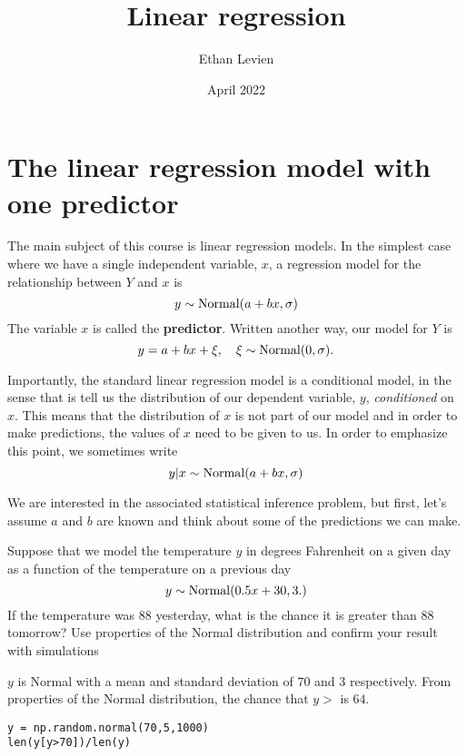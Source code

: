 

\title{\Huge \color{C1}  Linear regression}
\author{Ethan Levien}
\date{April 2022}



\maketitle

\tableofcontents




\section{The linear regression model with one predictor}
The main subject of this course is linear regression models. In the simplest case where we have a single independent variable, $x$, a regression model for the relationship between $Y$ and  $x$ is 
\begin{equation}\label{eq:reg}
y \sim {\rm Normal}(a+ b x,\sigma)
\end{equation}
The variable $x$ is called the {\bf predictor}.  Written another way, our model for $Y$ is 
\begin{equation}
y =a+ bx + \xi,\quad \xi \sim {\rm Normal}(0,\sigma).
\end{equation}


Importantly, the standard linear regression model is a conditional model, in the sense that is tell us the distribution of our dependent variable, $y$, \emph{conditioned} on $x$. This means that the distribution of $x$ is not part of our model and in order to make predictions, the values of $x$ need to be given to us. In order to emphasize this point, we sometimes write 
\begin{equation}\label{eq:reg}
y|x \sim {\rm Normal}(a+ b x,\sigma)
\end{equation}

We are interested in the associated statistical inference problem, but first, let's assume $a$ and $b$ are known and think about some of the predictions we can make.  

\begin{example} Suppose that we model the temperature $y$ in degrees Fahrenheit on a given day as a function of the temperature on a previous day 
\begin{equation}
y \sim {\rm Normal}(0.5x+ 30,3.)
\end{equation}
If the temperature was $88$ yesterday, what is the chance it is greater than $88$ tomorrow? Use properties of the Normal distribution and confirm your result with simulations
\end{example}
\begin{solution}
$y$ is Normal with a mean and standard deviation of $70$ and $3$ respectively. From properties of the Normal distribution, the chance that $y>$ is $64$. 
\begin{Verbatim}
y = np.random.normal(70,5,1000)
len(y[y>70])/len(y)
\end{Verbatim}
\end{solution}



